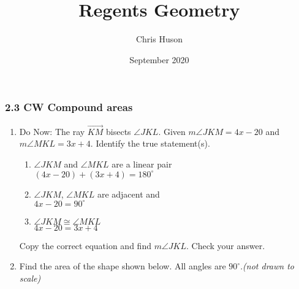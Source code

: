 \documentclass[12pt, twoside]{article}
\title{Regents Geometry}
\author{Chris Huson}
\date{September 2020}
\begin{document}
\subsubsection*{2.3 CW Compound areas}
\begin{enumerate}
\item Do Now: The ray $\overrightarrow{KM}$ bisects $\angle JKL$. Given $m\angle JKM = 4x-20$ and \\$m\angle MKL = 3x+4$. Identify the true statement(s).
 \begin{multicols}{2}
    \begin{enumerate}
      \item $\angle JKM$ and $\angle MKL$ are a linear pair\\
      $(4x-20) + (3x+4)=180^\circ$
      \item $\angle JKM$, $\angle MKL$ are adjacent and\\
      $4x-20 =90^\circ$
      \item $\angle JKM \cong \angle MKL$\\
      $4x-20 = 3x+4$
  \end{enumerate}
  \begin{center}
  \end{center}
\end{multicols}
Copy the correct equation and find $m\angle JKL$. Check your answer. \vspace{8cm}

\item Find the area of the shape shown below. All angles are $90^\circ$.\hfill \emph{(not drawn to scale)}
    \begin{flushleft}
    \end{flushleft}


\end{enumerate}
\end{document}
